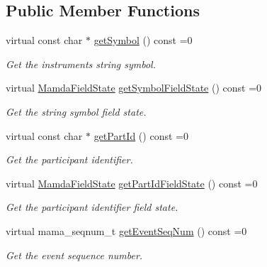 \subsection*{Public Member Functions}
\begin{CompactItemize}
\item 
virtual const char $\ast$ \hyperlink{classWombat_1_1MamdaBasicEvent_8783b136a1305d21c578ced8618c090b}{get\-Symbol} () const =0
\begin{CompactList}\small\item\em Get the instruments string symbol. \item\end{CompactList}\item 
virtual \hyperlink{namespaceWombat_93aac974f2ab713554fd12a1fa3b7d2a}{Mamda\-Field\-State} \hyperlink{classWombat_1_1MamdaBasicEvent_ef95e19f4babb0e5ea8549d6cf29d13f}{get\-Symbol\-Field\-State} () const =0
\begin{CompactList}\small\item\em Get the string symbol field state. \item\end{CompactList}\item 
virtual const char $\ast$ \hyperlink{classWombat_1_1MamdaBasicEvent_94e531c6ae9ae7798725db14facbd6e2}{get\-Part\-Id} () const =0
\begin{CompactList}\small\item\em Get the participant identifier. \item\end{CompactList}\item 
virtual \hyperlink{namespaceWombat_93aac974f2ab713554fd12a1fa3b7d2a}{Mamda\-Field\-State} \hyperlink{classWombat_1_1MamdaBasicEvent_c361c99af2cf7eb9f5621d89f744fc62}{get\-Part\-Id\-Field\-State} () const =0
\begin{CompactList}\small\item\em Get the participant identifier field state. \item\end{CompactList}\item 
virtual mama\_\-seqnum\_\-t \hyperlink{classWombat_1_1MamdaBasicEvent_1fd845d48e95b4ee3beafc72d1ac2adf}{get\-Event\-Seq\-Num} () const =0
\begin{CompactList}\small\item\em Get the event sequence number. \item\end{CompactList}\item 

\end{CompactItemize}
